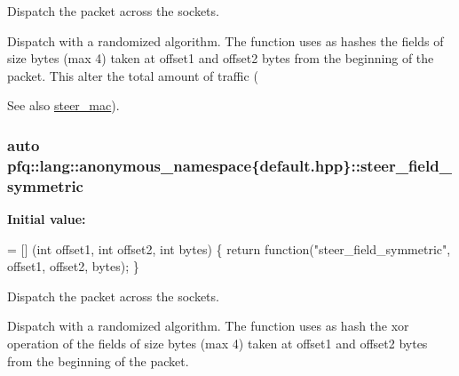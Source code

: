 Dispatch the packet across the sockets. 

Dispatch with a randomized algorithm. The function uses as hashes the fields of {\ttfamily size} bytes (max 4) taken at {\ttfamily offset1} and {\ttfamily offset2} bytes from the beginning of the packet. This alter the total amount of traffic (\begin{DoxySeeAlso}{See also}
\hyperlink{namespacepfq_1_1lang_1_1anonymous__namespace_02default_8hpp_03_ad51e91e3b485c729ac1ba39a46e337a0}{steer\+\_\+mac}). 
\end{DoxySeeAlso}
\subsubsection[{\texorpdfstring{steer\+\_\+field\+\_\+symmetric}{steer_field_symmetric}}]{\setlength{\rightskip}{0pt plus 5cm}auto pfq\+::lang\+::anonymous\+\_\+namespace\{default.\+hpp\}\+::steer\+\_\+field\+\_\+symmetric}\hypertarget{namespacepfq_1_1lang_1_1anonymous__namespace_02default_8hpp_03_a422c7bafe8240549d193903890f9ec48}{}\label{namespacepfq_1_1lang_1_1anonymous__namespace_02default_8hpp_03_a422c7bafe8240549d193903890f9ec48}
{\bfseries Initial value\+:}
\begin{DoxyCode}
= [] (\textcolor{keywordtype}{int} offset1, \textcolor{keywordtype}{int} offset2, \textcolor{keywordtype}{int} bytes) \{
                                \textcolor{keywordflow}{return} \textcolor{keyword}{function}(\textcolor{stringliteral}{"steer\_field\_symmetric"}, offset1, offset2, bytes);
                           \}
\end{DoxyCode}


Dispatch the packet across the sockets. 

Dispatch with a randomized algorithm. The function uses as {\ttfamily hash} the xor operation of the fields of {\ttfamily size} bytes (max 4) taken at {\ttfamily offset1} and {\ttfamily offset2} bytes from the beginning of the packet. 
